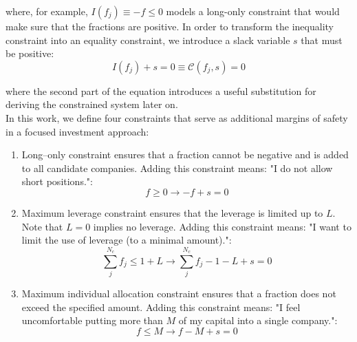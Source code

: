 \documentclass{article}
\begin{document}
\noindent where, for example, $I(f_j) \equiv -f \le 0$ models a long-only
constraint that would make sure that the fractions are positive. In order to
transform the inequality constraint into an equality constraint, we introduce a
slack variable $s$ that must be positive:
\begin{equation}
\label{eq:10}
    I(f_j) + s = 0 \equiv \mathcal{C}(f_j, s) = 0
\end{equation}

\noindent where the second part of the equation introduces a useful substitution
for deriving the constrained system later on.\\

\indent In this work, we define four constraints that serve as additional
margins of safety in a focused investment approach:
\begin{enumerate}
    \item Long--only constraint ensures that a fraction cannot be negative and
    is added to all candidate companies. Adding this constraint means: "I do not
    allow short positions.":
    \begin{equation}
        \label{eq:11}
            f \ge 0 \rightarrow -f + s = 0
        \end{equation}

    \item Maximum leverage constraint ensures that the leverage is limited up to
    $L$. Note that $L = 0$ implies no leverage. Adding this constraint means: "I
    want to limit the use of leverage (to a minimal amount).":
        \begin{equation}
        \label{eq:12}
            \sum_j^{N_c} f_j \le 1 + L \rightarrow \sum_j^{N_c} f_j - 1 - L + s = 0
        \end{equation}

    \item Maximum individual allocation constraint ensures that a fraction does
    not exceed the specified amount. Adding this constraint means: "I feel
    uncomfortable putting more than $M$ of my capital into a single company.":
        \begin{equation}
        \label{eq:13}
            f \le M \rightarrow f - M + s = 0
        \end{equation}


\end{enumerate}
\end{document}
